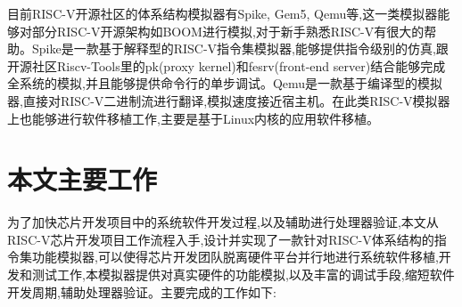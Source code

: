 目前RISC-V开源社区的体系结构模拟器有Spike, Gem5, Qemu\cite{bellard2005qemu}等,这一类模拟器能够对部分RISC-V开源架构如BOOM\cite{celio2016berkeley}进行模拟,对于新手熟悉RISC-V有很大的帮助。Spike是一款基于解释型的RISC-V指令集模拟器,能够提供指令级别的仿真,跟开源社区Riscv-Tools里的pk(proxy kernel)和fesrv(front-end server)结合能够完成全系统的模拟,并且能够提供命令行的单步调试。Qemu是一款基于编译型的模拟器\cite{varga2010omnet++},直接对RISC-V二进制流进行翻译,模拟速度接近宿主机。在此类RISC-V模拟器上也能够进行软件移植工作,主要是基于Linux内核的应用软件移植。



\section{本文主要工作}
为了加快芯片开发项目中的系统软件开发过程,以及辅助进行处理器验证,本文从RISC-V芯片开发项目工作流程入手,设计并实现了一款针对RISC-V体系结构的指令集功能模拟器,可以使得芯片开发团队脱离硬件平台并行地进行系统软件移植,开发和测试工作,本模拟器提供对真实硬件的功能模拟,以及丰富的调试手段,缩短软件开发周期,辅助处理器验证。主要完成的工作如下:


